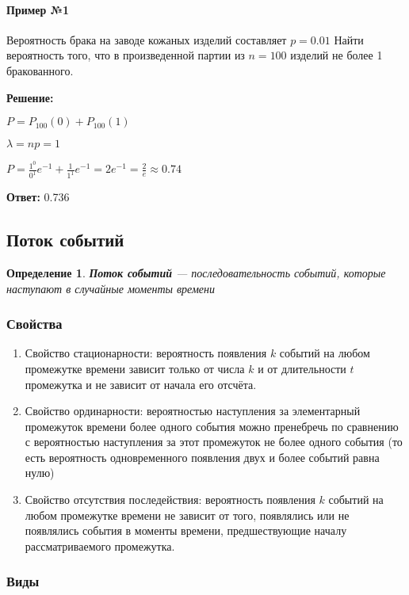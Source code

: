 \documentclass{article}
\newtheorem{definition}{Определение}
\begin{document}
\paragraph{Пример №1}

Вероятность брака на заводе кожаных изделий составляет $p = 0.01$ Найти вероятность того, что в произведенной партии из $n = 100$ изделий не более 1 бракованного.

\textbf{Решение:}

$P = P_{100}(0) + P_{100}(1)$

$\lambda = np = 1$

$P = \frac{1^{0}}{0^{1}} e^{-1} + \frac{1}{1^1} e^{-1} = 2e^{-1} = \frac{2}{e} \approx 0.74$

\textbf{Ответ:} 0.736

\subsection{Поток событий}

\begin{definition}
    \textbf{Поток событий} — последовательность событий, которые наступают в случайные моменты времени
\end{definition}

\subsubsection{Свойства}

\begin{enumerate}
    \item Свойство стационарности: вероятность появления $k$ событий на любом промежутке времени зависит только от числа $k$ и от длительности $t$ промежутка и не зависит от начала его отсчёта.
    \item Свойство ординарности: вероятностью наступления за элементарный промежуток времени более одного события можно пренебречь по сравнению с вероятностью наступления за этот промежуток не более одного события (то есть вероятность одновременного появления двух и более событий равна нулю)
    \item Свойство отсутствия последействия: вероятность появления $k$ событий на любом промежутке времени не зависит от того, появлялись или не появлялись события в моменты времени, предшествующие началу рассматриваемого промежутка.
\end{enumerate}

\subsubsection{Виды}
\end{document}
